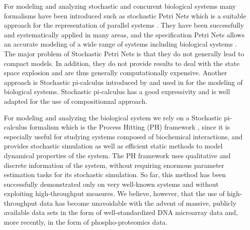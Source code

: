 


For modeling and analyzing stochastic and concurent biological systems many formalisms have been introduced such as 
stochastic Petri Nets which is a suitable approach for the representation of parallel systems \cite{molloy1982performance}. 
They have been successfully and systematically applied in many areas, and the specification Petri Nets
allows an accurate modeling of a wide range of systems including biological systems \cite{heiner2008petri}. The major 
problem of Stochastic Petri Nets is that they do not generally lead to compact models. In addition,
they do not provide results to deal with the state space explosion and are thus generally computationally
expensive. Another approach is Stochastic pi-calculus introduced by \cite{priami1995stochastic} and used in 
\cite{maurin2009modeling} for the modeling of biological systems. Stochastic pi-calculus has a good
expressivity and is well adapted for the use of compositionnal approach.

For modeling and analyzing the biological system we rely on a Stochastic pi-calculus formalism which is the Process Hitting (PH) framework \cite{PMR10-TCSB}, 
since it is especially useful for studying systems composed of biochemical interactions, and provides
stochastic simulation as well as efficient static methods to model dynamical properties of the system.
The PH framework uses qualitative and discrete information of the system, without requiring enormous parameter estimation tasks
 for its stochastic simulation. 
So far, this method has been successfully demonstrated only on very well-known systems and without exploiting 
high-throughput measures. We believe, however, that the use of high-throughput data has become unavoidable with 
the advent of massive, publicly available data sets in the form of well-standardized DNA microarray data and, 
more recently, in the form of phospho-proteomics data.  




